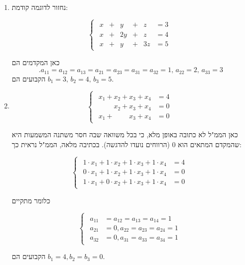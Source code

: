 \documentclass[
  hebrew,
  12pt,
  a4paper,
  oneside]{book}
\theoremstyle{definition}
\theoremstyle{remark}
\theoremstyle{plain}
\theoremstyle{remark}
\begin{document}
\begin{example}

~

\begin{enumerate}
\def\labelenumi{\arabic{enumi}.}
\item
  נחזור לדוגמה קודמת:

  \[\begin{cases}
  \begin{alignedat}{7}
  x &{}+{}&  y &{}+{}&  z &= 3 \\[4pt]
  x &{}+{}& 2y &{}+{}&  z &= 4 \\[4pt]
  x &{}+{}&  y &{}+{}& 3z &= 5
  \end{alignedat}
  \end{cases}\]

  כאן המקדמים הם
  \[.a_{11}=a_{12}=a_{13}=a_{21}=a_{23}=a_{31}=a_{32}=1,\,a_{22}=2,\,a_{33}=3\]
  הקבועים הם \(b_1=3,\,b_2=4,\,b_3=5\).
\item
  \[\begin{cases}
  \begin{aligned}
  x_1 + x_2 + x_3 + x_4 &= 4 \\[4pt]
  \phantom{x_1 + {}}x_2 + x_3 + x_4 &= 0 \\[4pt]
  x_1 + \phantom{x_2 + {}}x_3 + x_4 &= 0
  \end{aligned}
  \end{cases}\]

  כאן הממ"ל לא כתובה באופן מלא, כי בכל משוואה שבה חסר משתנה המשמעות היא
  שהמקדם המתאים הוא \(0\) (הרווחים נועדו להדגשה). בכתיבה מלאה, הממ"ל
  נראית כך:

  \[\begin{cases}
  \begin{aligned}
  1\cdot x_1 + 1\cdot x_2 +1\cdot x_3 +1\cdot x_4 &= 4 \\[4pt]
  0\cdot x_1 +1\cdot x_2 +1\cdot x_3 +1\cdot x_4 &= 0 \\[4pt]
  1\cdot x_1 + 0\cdot x_2 +1\cdot x_3 +1\cdot x_4 &= 0
  \end{aligned}
  \end{cases}\]

  כלומר מתקיים

  \[\begin{cases}
  \begin{aligned}
  a_{11} &= a_{12} = a_{13} = a_{14} = 1 \\[4pt]
  a_{21} &= 0,a_{22} = a_{23} = a_{24} = 1 \\[4pt]
  a_{32} &= 0, a_{31} = a_{33} = a_{34} = 1
  \end{aligned}
  \end{cases}\]

  הקבועים הם \(b_1=4, b_2=b_3=0\).
\end{enumerate}

\end{example}
\end{document}
